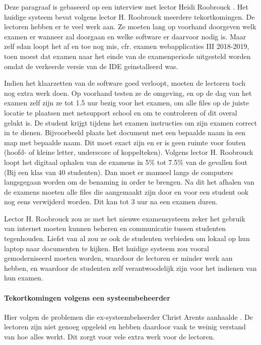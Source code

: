 Deze paragraaf is gebaseerd op een interview met lector Heidi Roobrouck \autocite{Roobrouck2019}. Het huidige systeem bevat volgens lector H. Roobrouck meerdere tekortkomingen. De lectoren hebben er te veel werk aan. Ze moeten lang op voorhand doorgeven welk examen er wanneer zal doorgaan en welke software er daarvoor nodig is. Maar zelf sdan loopt het af en toe nog mis, cfr. examen webapplicaties III 2018-2019, toen moest dat examen naar het einde van de examenperiode uitgesteld worden omdat de verkeerde versie van de IDE geinstalleerd was.

Indien het klaarzetten van de software goed verloopt, moeten de lectoren toch nog extra werk doen. Op voorhand testen ze de omgeving, en op de dag van het examen zelf zijn ze tot 1.5 uur bezig voor het examen, om alle files op de juiste locatie te plaatsen met netsupport school en om te controleren of dit overal gelukt is. De student krijgt tijdens het examen instructies om zijn examen correct in te dienen. Bijvoorbeeld plaats het document met een bepaalde naam in een map met bepaalde naam. Dit moet exact zijn en er is geen ruimte voor fouten (hoofd- of kleine letter, underscore of koppelteken). Volgens lector H. Roobrouck loopt het digitaal ophalen van de examens in 5\% tot 7.5\% van de gevallen fout (Bij een klas van 40 studenten).
Dan moet er manueel langs de computers langsgegaan worden om de benaming in order te brengen. Na dit het afhalen van de examens moeten alle files die aangemaakt zijn door en voor een student ook nog eens verwijderd worden. Dit kan tot 3 uur na een examen duren.  

Lector H. Roobrouck zou ze met het nieuwe examensysteem zeker het gebruik van internet moeten kunnen beheren en communicatie tussen studenten tegenhouden. Liefst van al zou ze ook de studenten verbieden om lokaal op hun laptop naar documenten te kijken. Het huidige systeem zou vooral gemoderniseerd moeten worden, waardoor de lectoren er minder werk aan hebben, en waardoor de studenten zelf verantwoodelijk zijn voor het indienen van hun examen. 


\paragraph{Tekortkomingen volgens een systeembeheerder}
Hier volgen de problemen die ex-systeembeheerder Christ Arents aanhaalde \autocite{Arents2019}. De lectoren zijn niet genoeg opgeleid en hebben daardoor vaak te weinig verstand van hoe alles werkt. Dit zorgt voor vele extra werk voor de lectoren. 


